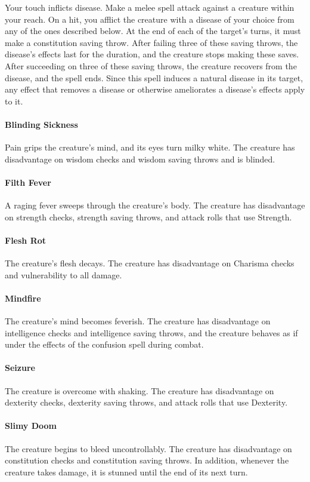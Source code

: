 \documentclass[12pt,showtrims]{memoir}
\begin{document}
\vspace{1\baselineskip}\noindent Your touch inflicts disease. Make a melee spell attack against a creature within your reach. On a hit, you afflict the creature with a disease of your choice from any of the ones described below. At the end of each of the target's turns, it must make a constitution saving throw. After failing three of these saving throws, the disease's effects last for the duration, and the creature stops making these saves. After succeeding on three of these saving throws, the creature recovers from the disease, and the spell ends. Since this spell induces a natural disease in its target, any effect that removes a disease or otherwise ameliorates a disease's effects apply to it. \paragraph{Blinding Sickness} Pain grips the creature's mind, and its eyes turn milky white. The creature has disadvantage on wisdom checks and wisdom saving throws and is blinded. \paragraph{Filth Fever} A raging fever sweeps through the creature's body. The creature has disadvantage on strength checks, strength saving throws, and attack rolls that use Strength. \paragraph{Flesh Rot} The creature's flesh decays. The creature has disadvantage on Charisma checks and vulnerability to all damage. \paragraph{Mindfire} The creature's mind becomes feverish. The creature has disadvantage on intelligence checks and intelligence saving throws, and the creature behaves as if under the effects of the confusion spell during combat. \paragraph{Seizure} The creature is overcome with shaking. The creature has disadvantage on dexterity checks, dexterity saving throws, and attack rolls that use Dexterity. \paragraph{Slimy Doom} The creature begins to bleed uncontrollably. The creature has disadvantage on constitution checks and constitution saving throws. In addition, whenever the creature takes damage, it is stunned until the end of its next turn.
\end{document}
